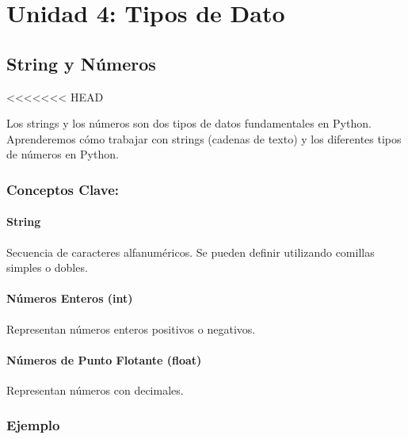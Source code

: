\documentclass[
  a4paper,
  DIV=11,
  numbers=noendperiod,
  onepage,
  openany]{scrreprt}
\begin{document}
\part{Unidad 4: Tipos de Dato}

\hypertarget{string-y-nuxfameros}{%
\chapter{String y Números}\label{string-y-nuxfameros}}

\textless\textless\textless\textless\textless\textless\textless{} HEAD

Los strings y los números son dos tipos de datos fundamentales en
Python. Aprenderemos cómo trabajar con strings (cadenas de texto) y los
diferentes tipos de números en Python.

\hypertarget{conceptos-clave-16}{%
\section{Conceptos Clave:}\label{conceptos-clave-16}}

\hypertarget{string}{%
\subsection{String}\label{string}}

Secuencia de caracteres alfanuméricos. Se pueden definir utilizando
comillas simples o dobles.

\hypertarget{nuxfameros-enteros-int}{%
\subsection{Números Enteros (int)}\label{nuxfameros-enteros-int}}

Representan números enteros positivos o negativos.

\hypertarget{nuxfameros-de-punto-flotante-float}{%
\subsection{Números de Punto Flotante
(float)}\label{nuxfameros-de-punto-flotante-float}}

Representan números con decimales.

\hypertarget{ejemplo-16}{%
\section{Ejemplo}\label{ejemplo-16}}
\end{document}
